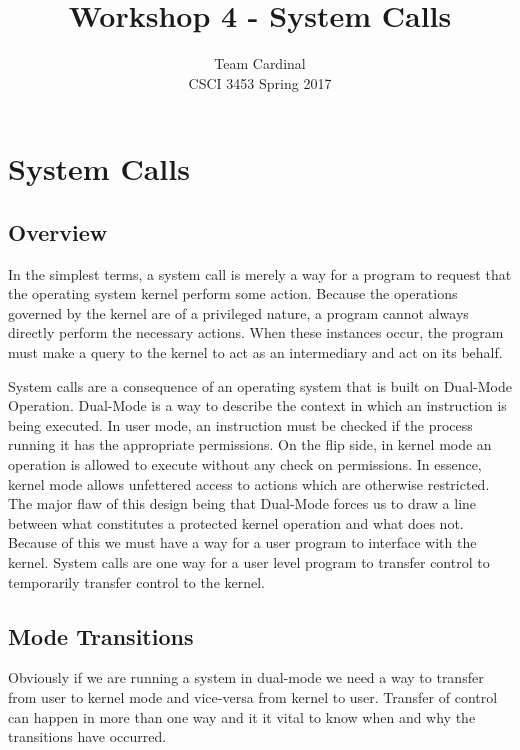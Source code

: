 \documentclass[11pt, letterpaper]{article}
\begin{document}

\title{Workshop 4 - System Calls}
\author{Team Cardinal\\CSCI 3453 Spring 2017}
\maketitle




\section{System Calls}

\subsection{Overview}
In the simplest terms, a system call is merely a way for a program to request that the operating system kernel perform some action. Because the operations governed by the kernel are of a privileged nature, a program cannot always directly perform the necessary actions. When these instances occur, the program must make a query to the kernel to act as an intermediary and act on its behalf. 

System calls are a consequence of an operating system that is built on Dual-Mode Operation. Dual-Mode is a way to describe the context in which an instruction is being executed. In user mode, an instruction must be checked if the process running it has the appropriate permissions. On the flip side, in kernel mode an operation is allowed to execute without any check on permissions. In essence, kernel mode allows unfettered access to actions which are otherwise restricted. The major flaw of this design being that Dual-Mode forces us to draw a line between what constitutes a protected kernel operation and what does not. Because of this we must have a way for a user program to interface with the kernel. System calls are one way for a user level program to transfer control to temporarily transfer control to the kernel.

\subsection{Mode Transitions}
Obviously if we are running a system in dual-mode we need a way to transfer from user to kernel mode and vice-versa from kernel to user. Transfer of control can happen in more than one way and it it vital to know when and why the transitions have occurred.
\end{document}

